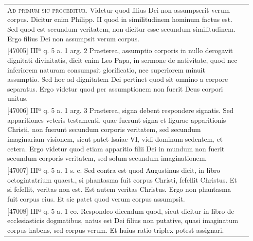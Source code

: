 \documentclass[paper=a4paper,fontsize=10pt,jafontsize=9pt,titlepage]{jlreq}
\begin{document}
\begin{longtable}{p{21em}p{21em}}

{\Huge A}{\scshape d primum sic proceditur}. Videtur quod filius Dei non assumpserit verum
corpus. Dicitur enim Philipp. II quod in similitudinem hominum factus
est. Sed quod est secundum veritatem, non dicitur esse secundum
similitudinem. Ergo filius Dei non assumpsit verum corpus.


&


\\


[47005] IIIª q. 5 a. 1 arg. 2
Praeterea, assumptio corporis in nullo derogavit dignitati divinitatis,
dicit enim Leo Papa, in sermone de nativitate, quod nec inferiorem
naturam consumpsit glorificatio, nec superiorem minuit assumptio. Sed
hoc ad dignitatem Dei pertinet quod sit omnino a corpore separatus. Ergo
videtur quod per assumptionem non fuerit Deus corpori unitus.


&


\\


[47006] IIIª q. 5 a. 1 arg. 3
Praeterea, signa debent respondere signatis. Sed apparitiones veteris
testamenti, quae fuerunt signa et figurae apparitionis Christi, non
fuerunt secundum corporis veritatem, sed secundum imaginariam visionem,
sicut patet Isaiae VI, vidi dominum sedentem, et cetera. Ergo videtur
quod etiam apparitio filii Dei in mundum non fuerit secundum corporis
veritatem, sed solum secundum imaginationem.


&


\\


[47007] IIIª q. 5 a. 1 s. c.
Sed contra est quod Augustinus dicit, in libro octogintatrium quaest.,
si phantasma fuit corpus Christi, fefellit Christus. Et si fefellit,
veritas non est. Est autem veritas Christus. Ergo non phantasma fuit
corpus eius. Et sic patet quod verum corpus assumpsit.


&


\\


[47008] IIIª q. 5 a. 1 co.
Respondeo dicendum quod, sicut dicitur in libro de ecclesiasticis
dogmatibus, natus est Dei filius non putative, quasi imaginatum corpus
habens, sed corpus verum. Et huius ratio triplex potest
assignari. 

&



\\


\end{longtable}
\end{document}
